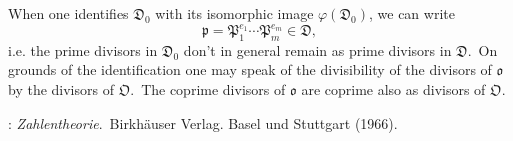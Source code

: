 \documentclass[12pt]{article}
\begin{document}
When one identifies $\mathfrak{D}_0$ with its isomorphic image $\varphi(\mathfrak{D}_0)$, we can write
$$\mathfrak{p} = \mathfrak{P}_1^{e_1}\cdots\mathfrak{P}_m^{e_m} \in \mathfrak{D},$$
i.e. the prime divisors in $\mathfrak{D}_0$ don't in general remain as prime divisors in $\mathfrak{D}$.\, On grounds of the identification one may speak of the divisibility of the divisors of $\mathfrak{o}$ by the divisors of $\mathfrak{O}$.\, The coprime divisors of $\mathfrak{o}$ are coprime also as divisors of $\mathfrak{O}$.



\begin{thebibliography}{9}
: {\em Zahlentheorie}.\, Birkh\"auser Verlag. Basel und Stuttgart (1966).
\end{thebibliography}
\end{document}
